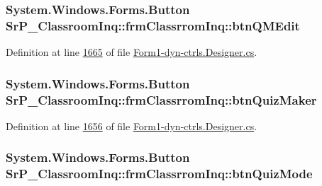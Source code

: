 \hypertarget{class_sr_p___classroom_inq_1_1frm_classrrom_inq_ab86f3e7a592038c27499e00ec0a7fb3b}{
\subsubsection[{btn\-Q\-M\-Edit}]{\setlength{\rightskip}{0pt plus 5cm}\-System.\-Windows.\-Forms.\-Button {\bf \-Sr\-P\-\_\-\-Classroom\-Inq\-::frm\-Classrrom\-Inq\-::btn\-Q\-M\-Edit}}}
\label{class_sr_p___classroom_inq_1_1frm_classrrom_inq_ab86f3e7a592038c27499e00ec0a7fb3b}


\-Definition at line \hyperlink{_form1-dyn-ctrls_8_designer_8cs_source_l01665}{1665} of file \hyperlink{_form1-dyn-ctrls_8_designer_8cs_source}{\-Form1-\/dyn-\/ctrls.\-Designer.\-cs}.

\hypertarget{class_sr_p___classroom_inq_1_1frm_classrrom_inq_a521d725b634462f428d792ca3db59e2e}{
\subsubsection[{btn\-Quiz\-Maker}]{\setlength{\rightskip}{0pt plus 5cm}\-System.\-Windows.\-Forms.\-Button {\bf \-Sr\-P\-\_\-\-Classroom\-Inq\-::frm\-Classrrom\-Inq\-::btn\-Quiz\-Maker}}}
\label{class_sr_p___classroom_inq_1_1frm_classrrom_inq_a521d725b634462f428d792ca3db59e2e}


\-Definition at line \hyperlink{_form1-dyn-ctrls_8_designer_8cs_source_l01656}{1656} of file \hyperlink{_form1-dyn-ctrls_8_designer_8cs_source}{\-Form1-\/dyn-\/ctrls.\-Designer.\-cs}.

\hypertarget{class_sr_p___classroom_inq_1_1frm_classrrom_inq_aed01a9041d00e0bef6cd7661bc9507d6}{
\subsubsection[{btn\-Quiz\-Mode}]{\setlength{\rightskip}{0pt plus 5cm}\-System.\-Windows.\-Forms.\-Button {\bf \-Sr\-P\-\_\-\-Classroom\-Inq\-::frm\-Classrrom\-Inq\-::btn\-Quiz\-Mode}}}
\label{class_sr_p___classroom_inq_1_1frm_classrrom_inq_aed01a9041d00e0bef6cd7661bc9507d6}



